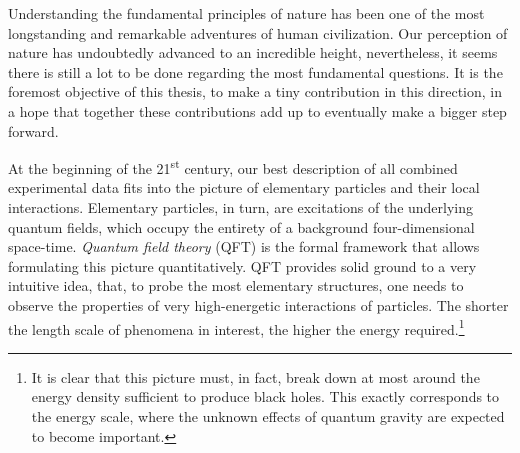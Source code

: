 Understanding the fundamental principles of nature has been one of the most
longstanding and remarkable adventures of human civilization.
Our perception of nature has undoubtedly advanced to an incredible height,
nevertheless, it seems there is still a lot to be done regarding the most fundamental questions.
It is the foremost objective of this thesis, to
make a tiny contribution in this direction, in a hope that together these contributions add up to eventually make a bigger step forward.

At the beginning of the 21\textsuperscript{st} century, our best description of all combined experimental data fits into the picture of elementary particles and their local interactions.
Elementary particles, in turn, are excitations of the underlying quantum fields, which occupy the entirety of a background four-dimensional space-time.
\emph{Quantum field theory} (QFT) is the formal framework that allows formulating this picture quantitatively.
QFT provides solid ground to a very intuitive idea,
that, to probe the most elementary structures, one needs to observe the properties of very high-energetic interactions of particles.
The shorter the length scale of phenomena in interest, the higher the energy required.\footnote{
  It is clear that this picture must, in fact, break down at most around the energy density sufficient to produce black holes.
  This exactly corresponds to the energy scale, where the unknown effects of quantum gravity are expected to become important.
}

